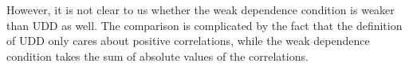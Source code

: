 \documentclass[11pt]{article}
\begin{document}
\begin{enumerate}
    However, it is not clear to us whether the weak dependence condition is weaker than UDD as well.
    The comparison is complicated by the fact that the definition of UDD only cares about positive correlations, while the weak dependence condition takes the sum of absolute values of the correlations.
    

%    

\end{enumerate}
\end{document}
